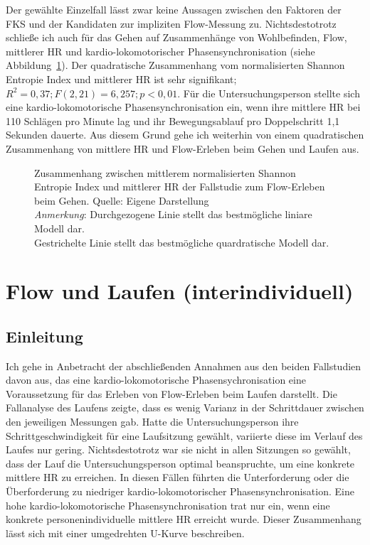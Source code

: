 Der gewählte Einzelfall lässt zwar keine Aussagen zwischen den Faktoren der \ac{FKS} und der Kandidaten zur impliziten Flow-Messung zu. Nichtsdestotrotz schließe ich auch für das Gehen auf Zusammenhänge von Wohlbefinden, Flow, mittlerer \ac{HR} und kardio-lokomotorischer Phasensynchronisation (siehe Abbildung~\ref{fig:5_14_regression_extra}). Der quadratische Zusammenhang vom normalisierten Shannon Entropie Index und mittlerer \ac{HR} ist sehr signifikant; $R^2 = 0{,}37; F(2, 21) = 6,257; p < 0{,}01$. Für die Untersuchungsperson stellte sich eine kardio-lokomotorische Phasensynchronisation ein, wenn ihre mittlere \ac{HR} bei 110 Schlägen pro Minute lag und ihr Bewegungsablauf pro Doppelschritt 1,1 Sekunden dauerte. Aus diesem Grund gehe ich weiterhin von einem quadratischen Zusammenhang von mittlere \ac{HR} und Flow-Erleben beim Gehen und Laufen aus.

\begin{figure}
	
	\caption[Zusammenhang zwischen mittlerem normalisierten Shannon Entropie Index und mittlerer HR (Fallstudie: Gehen)]{Zusammenhang zwischen mittlerem normalisierten Shannon Entropie Index und mittlerer HR der Fallstudie zum Flow-Erleben beim Gehen. Quelle: Eigene Darstellung \\ \hspace{\textwidth}\emph{Anmerkung}: Durchgezogene Linie stellt das bestmögliche liniare Modell dar. \\ \hspace{\textwidth}Gestrichelte Linie stellt das bestmögliche quardratische Modell dar.}
	\label{fig:5_14_regression_extra}
\end{figure}

\section{Flow und Laufen (interindividuell)}
\label{sec:flow_und_laufen_interindividuell}

\subsection{Einleitung}

Ich gehe in Anbetracht der abschließenden Annahmen aus den beiden Fallstudien davon aus, das eine kardio-lokomotorische Phasensychronisation eine Voraussetzung für das Erleben von Flow-Erleben beim Laufen darstellt. Die Fallanalyse des Laufens zeigte, dass es wenig Varianz in der Schrittdauer zwischen den jeweiligen Messungen gab. Hatte die Untersuchungsperson ihre Schrittgeschwindigkeit für eine Laufsitzung gewählt, variierte diese im Verlauf des Laufes nur gering. Nichtsdestotrotz war sie nicht in allen Sitzungen so gewählt, dass der Lauf die Untersuchungsperson optimal beanspruchte, um eine konkrete mittlere \ac{HR} zu erreichen. In diesen Fällen führten die Unterforderung oder die Überforderung zu niedriger kardio-lokomotorischer Phasensynchronisation. Eine hohe kardio-lokomotorische Phasensynchronisation trat nur ein, wenn eine konkrete personenindividuelle mittlere \ac{HR} erreicht wurde. Dieser Zusammenhang lässt sich mit einer umgedrehten U-Kurve beschreiben. 

